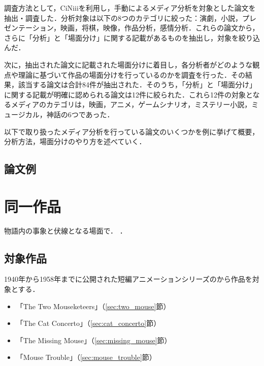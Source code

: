 調査方法として，CiNii\cite{CiNii}iを利用し，手動によるメディア分析を対象とした論文を抽出・調査した．分析対象は以下の8つのカテゴリに絞った：演劇，小説，プレゼンテーション，映画，将棋，映像，作品分析，感情分析．これらの論文から，さらに「分析」と「場面分け」に関する記載があるものを抽出し，対象を絞り込んだ．

次に，抽出された論文に記載された場面分けに着目し，各分析者がどのような観点や理論に基づいて作品の場面分けを行っているのかを調査を行った．その結果，該当する論文は合計84件が抽出された．そのうち，「分析」と「場面分け」に関する記載が明確に認められる論文は12件に絞られた．これら12件の対象となるメディアのカテゴリは，映画，アニメ，ゲームシナリオ，ミステリー小説，ミュージカル，神話の6つであった．

以下で取り扱ったメディア分析を行っている論文のいくつかを例に挙げて概要，分析方法，場面分けのやり方を述べていく．

\subsection{論文例}




\section{同一作品}\label{sec:method}
物語内の事象と伏線となる場面で．
．

\subsection{対象作品}
1940年から1958年までに公開された短編アニメーションシリーズの\tomjerry \cite{tom}から作品を対象とする．
\begin{itemize}
	\item 「The Two Mouseketeers」（\ref{sec:two_mouse}節）
	\item 「The Cat Concerto」（\ref{sec:cat_concerto}節）
	\item 「The Missing Mouse」（\ref{sec:missing_mouse}節）
	\item 「Mouse Trouble」（\ref{sec:mouse_trouble}節）
\end{itemize}

